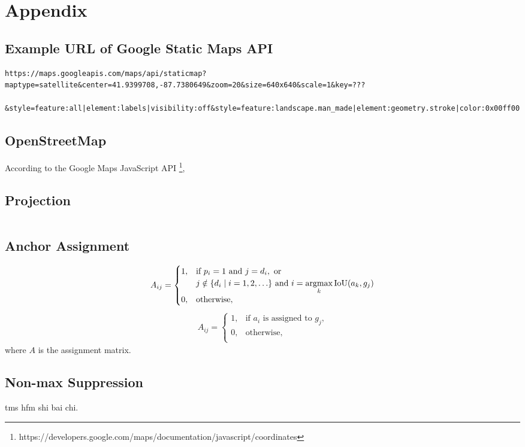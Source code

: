 \chapter{Appendix}

\section{Example URL of Google Static Maps API}\label{app:apimap}

\begin{lstlisting}
https://maps.googleapis.com/maps/api/staticmap?maptype=satellite&center=41.9399708,-87.7380649&zoom=20&size=640x640&scale=1&key=???

&style=feature:all|element:labels|visibility:off&style=feature:landscape.man_made|element:geometry.stroke|color:0x00ff00
\end{lstlisting}

\section{OpenStreetMap}\label{app:apiosm}

According to the Google Maps JavaScript API \footnote{https://developers.google.com/maps/documentation/javascript/coordinates}, 

\section{Projection}\label{app:projec}

\begin{lstlisting}
\end{lstlisting}

\section{Anchor Assignment}\label{app:assignanchor}
\begin{equation}
\begin{aligned}
	A_{ij} = \begin{cases}
		1, & \text{if } p_i = 1 \text{ and } j = d_i, \text{ or }\\
		& j \notin \{d_i \mid i = 1,2,\ldots\} \text{ and } i = \operatorname*{argmax}\limits_{k} \text{IoU}(a_k, g_j) \\
		0, & \text{otherwise},\\
	\end{cases}
\end{aligned}
\end{equation}
\begin{equation}
\begin{aligned}
	A_{ij} = \begin{cases}
		1, & \text{if $a_i$ is assigned to $g_j$,}\\
		0, & \text{otherwise},\\
	\end{cases}
\end{aligned}
\end{equation}
where $A$ is the assignment matrix. 

\section{Non-max Suppression}\label{app:nms}
tms hfm shi bai chi.



